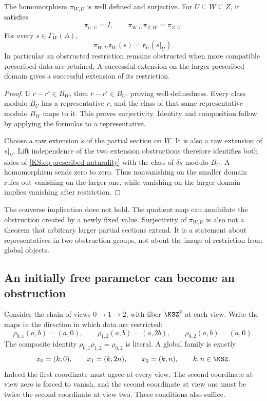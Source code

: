 \begin{KStheorem}\label{KS:KS59}
The homomorphism \(\pi_{W,U}\) is well defined and surjective. For \(U\subseteq W\subseteq Z\), it satisfies
\[
 \pi_{U,U}=I,\qquad \pi_{W,U}\pi_{Z,W}=\pi_{Z,U}.
\]
For every \(s\in\Gamma_W(A)\),
\begin{equation}\label{KS:eq:prescribed-naturality}
 \pi_{W,U}\mathfrak o_W(s)=\mathfrak o_U(s|_U).
\end{equation}
In particular an obstructed restriction remains obstructed when more compatible prescribed data are retained. A successful extension on the larger prescribed domain gives a successful extension of its restriction.
\end{KStheorem}
\begin{proof}
If \(r-r'\in B_W\), then \(r-r'\in B_U\), proving well-definedness. Every class modulo \(B_U\) has a representative \(r\), and the class of that same representative modulo \(B_W\) maps to it. This proves surjectivity. Identity and composition follow by applying the formulas to a representative.

Choose a raw extension \(\widetilde s\) of the partial section on \(W\). It is also a raw extension of \(s|_U\). Lift independence of the two extension obstructions therefore identifies both sides of \eqref{KS:eq:prescribed-naturality} with the class of \(\delta\widetilde s\) modulo \(B_U\). A homomorphism sends zero to zero. Thus nonvanishing on the smaller domain rules out vanishing on the larger one, while vanishing on the larger domain implies vanishing after restriction.
\end{proof}
The converse implication does not hold. The quotient map can annihilate the obstruction created by a newly fixed value. Surjectivity of \(\pi_{W,U}\) is also not a theorem that arbitrary larger partial sections extend. It is a statement about representatives in two obstruction groups, not about the image of restriction from global objects.

\subsection{An initially free parameter can become an obstruction}
Consider the chain of views \(0\to1\to2\), with fiber \(\KSZ^2\) at each view. Write the maps in the direction in which data are restricted:
\[
 \rho_{0,1}(a,b)=(a,0),\qquad
 \rho_{1,2}(a,b)=(a,2b),\qquad
 \rho_{0,2}(a,b)=(a,0).
\]
The composite identity \(\rho_{0,1}\rho_{1,2}=\rho_{0,2}\) is literal. A global family is exactly
\begin{equation}\label{KS:eq:branch-family}
 x_0=(k,0),\qquad x_1=(k,2n),\qquad x_2=(k,n),
 \qquad k,n\in\KSZ.
\end{equation}
Indeed the first coordinate must agree at every view. The second coordinate at view zero is forced to vanish, and the second coordinate at view one must be twice the second coordinate at view two. These conditions also suffice.


